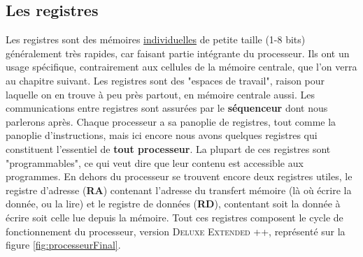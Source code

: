 \documentclass[12pt,a4paper]{report}
\begin{document}
\subsection{Les registres}
Les registres sont des mémoires \underline{individuelles} de petite taille (1-8 bits) généralement très rapides, car faisant partie intégrante du processeur. Ils ont un usage spécifique, contrairement aux cellules de la mémoire centrale, que l'on verra au chapitre suivant. Les registres sont des "espaces de travail", raison pour laquelle on en trouve à peu près partout, en mémoire centrale aussi. Les communications entre registres sont assurées par le \textbf{séquenceur} dont nous parlerons après. Chaque processeur a sa panoplie de registres, tout comme la panoplie d'instructions, mais ici encore nous avons quelques registres qui constituent l'essentiel de \textbf{tout processeur}.
La plupart de ces registres sont "programmables", ce qui veut dire que leur contenu est accessible aux programmes. En dehors du processeur se trouvent encore deux registres utiles, le registre d'adresse (\textbf{RA}) contenant l'adresse du transfert mémoire (là où écrire la donnée, ou la lire) et le registre de données (\textbf{RD}), contentant soit la donnée à écrire soit celle lue depuis la mémoire. Tout ces registres composent le cycle de fonctionnement du processeur, version \textsc{Deluxe Extended ++}, représenté sur la figure \ref{fig:processeurFinal}.
\end{document}
